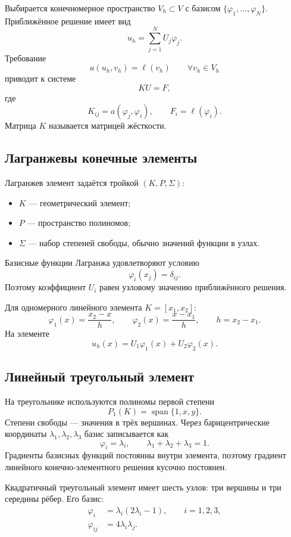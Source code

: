 Выбирается конечномерное пространство $V_h\subset V$ с базисом
$\{\varphi_1,\ldots,\varphi_N\}$. Приближённое решение имеет вид
\[
    u_h=\sum_{j=1}^{N}U_j\varphi_j.
\]
Требование
\[
    a(u_h,v_h)=\ell(v_h)
    \qquad\forall v_h\in V_h
\]
приводит к системе
\[
    KU=F,
\]
где
\[
    K_{ij}=a(\varphi_j,\varphi_i),
    \qquad
    F_i=\ell(\varphi_i).
\]
Матрица $K$ называется матрицей жёсткости.

\subsection{Лагранжевы конечные элементы}

Лагранжев элемент задаётся тройкой $(K,P,\Sigma)$:
\begin{itemize}
    \item $K$ --- геометрический элемент;
    \item $P$ --- пространство полиномов;
    \item $\Sigma$ --- набор степеней свободы, обычно значений функции в узлах.
\end{itemize}

Базисные функции Лагранжа удовлетворяют условию
\[
    \varphi_i(x_j)=\delta_{ij}.
\]
Поэтому коэффициент $U_i$ равен узловому значению приближённого решения.

Для одномерного линейного элемента $K=[x_1,x_2]$:
\[
    \varphi_1(x)=\frac{x_2-x}{h},
    \qquad
    \varphi_2(x)=\frac{x-x_1}{h},
    \qquad h=x_2-x_1.
\]
На элементе
\[
    u_h(x)=U_1\varphi_1(x)+U_2\varphi_2(x).
\]

\subsection{Линейный треугольный элемент}

На треугольнике используются полиномы первой степени
\[
    P_1(K)=\operatorname{span}\{1,x,y\}.
\]
Степени свободы --- значения в трёх вершинах. Через барицентрические координаты
$\lambda_1,\lambda_2,\lambda_3$ базис записывается как
\[
    \varphi_i=\lambda_i,
    \qquad
    \lambda_1+\lambda_2+\lambda_3=1.
\]
Градиенты базисных функций постоянны внутри элемента, поэтому градиент линейного
конечно-элементного решения кусочно постоянен.

Квадратичный треугольный элемент имеет шесть узлов: три вершины и три середины
рёбер. Его базис:
\[
\begin{aligned}
\varphi_i&=\lambda_i(2\lambda_i-1),\qquad i=1,2,3,\\
\varphi_{ij}&=4\lambda_i\lambda_j.
\end{aligned}
\]

